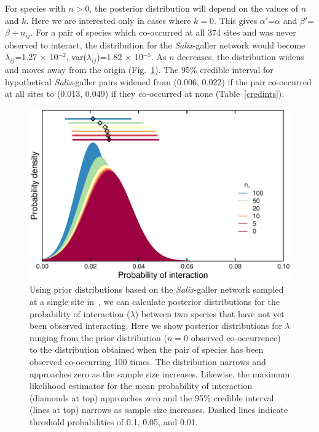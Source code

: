 \documentclass[12pt]{article}
\begin{document}
      For species with $n>0$, the posterior distribution will depend on the values of $n$ and $k$. Here we are interested only in cases where $k = 0$. This gives $\alpha'$=$\alpha$ and $\beta'$=$\beta + n_{ij}$. For a pair of species which co-occurred at all 374 sites and was never observed to interact, the distribution for the \emph{Salix}-galler network would become $\bar\lambda_{ij}$=1.27 $\times$ 10$^{-2}$, var($\lambda_{ij}$)=1.82 $\times$ 10$^{-5}$. As $n$ decreases, the distribution widens and moves away from the origin (Fig.~\ref{Salix_pdfs}). The 95\% credible interval for hypothetical \emph{Salix}-galler pairs widened from (0.006, 0.022) if the pair co-occurred at all sites to (0.013, 0.049) if they co-occurred at none (Table~\ref{credints}). 

      \begin{figure}[h!]
        \caption{Using prior distributions based on the \emph{Salix}-galler network sampled at a single site in~\citet{Kopelke2017}, we can calculate posterior distributions for the probability of interaction ($\lambda$) between two species that have not yet been observed interacting. Here we show posterior distributions for $\lambda$ ranging from the prior distribution ($n=0$ observed co-occurrence) to the distribution obtained when the pair of species has been observed co-occurring 100 times. The distribution narrows and approaches zero as the sample size increases. Likewise, the maximum likelihood estimator for the mean probability of interaction (diamonds at top) approaches zero and the 95\% credible interval (lines at top) narrows as sample size increases. Dashed lines indicate threshold probabilities of 0.1, 0.05, and 0.01.}
        \label{Salix_pdfs}
        \begin{center}
        \includegraphics*[width=.9\textwidth]{figures/SG_pdfs_increasing_N_Zillis.eps}
        \end{center}
        \end{figure}
\end{document}
